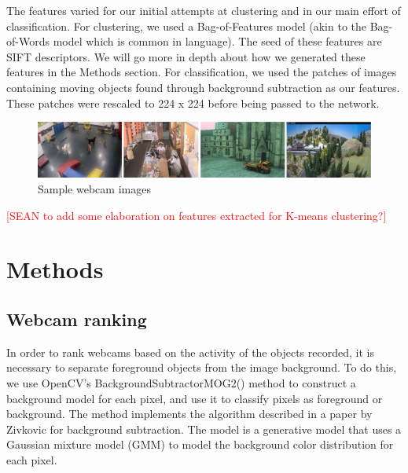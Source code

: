 \documentclass[10pt]{article} %
\begin{document}
The features varied for our initial attempts at clustering and in our main
effort of classification. For clustering, we used a Bag-of-Features model (akin
to the Bag-of-Words model which is common in language). The seed of these
features are SIFT descriptors. We will go more in depth about how we generated
these features in the Methods section. For classification, we used the patches
of images containing moving objects found through background subtraction as our
features. These patches were rescaled to 224 x 224 before being passed to the
network.

\begin{figure}[h]
\caption{Sample webcam images}
\includegraphics[scale = 0.25]{samples}
\end{figure}

\textcolor{red}{[SEAN to add some elaboration on features extracted for K-means clustering?]}

\section{Methods}
\subsection{Webcam ranking}
In order to rank webcams based on the activity of the objects recorded, it is necessary to separate foreground objects from the image background. To do this, we use OpenCV's BackgroundSubtractorMOG2() method to construct a background model for each pixel, and use it to classify pixels as foreground or background. The method implements the algorithm described in a paper by Zivkovic \cite{zivkovic} for background subtraction. The model is a generative model that uses a Gaussian mixture model (GMM) to model the background color distribution for each pixel. 
\end{document}
